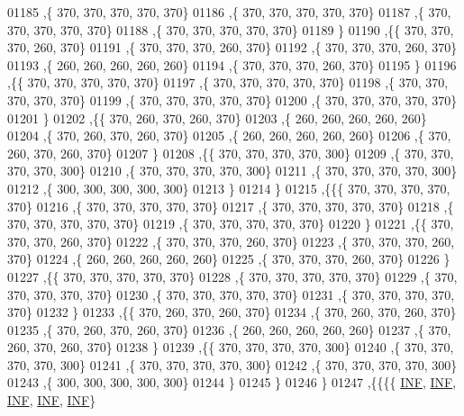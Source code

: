 \begin{DoxyCode}
01185    ,\{   370,   370,   370,   370,   370\}
01186    ,\{   370,   370,   370,   370,   370\}
01187    ,\{   370,   370,   370,   370,   370\}
01188    ,\{   370,   370,   370,   370,   370\}
01189    \}
01190   ,\{\{   370,   370,   370,   260,   370\}
01191    ,\{   370,   370,   370,   260,   370\}
01192    ,\{   370,   370,   370,   260,   370\}
01193    ,\{   260,   260,   260,   260,   260\}
01194    ,\{   370,   370,   370,   260,   370\}
01195    \}
01196   ,\{\{   370,   370,   370,   370,   370\}
01197    ,\{   370,   370,   370,   370,   370\}
01198    ,\{   370,   370,   370,   370,   370\}
01199    ,\{   370,   370,   370,   370,   370\}
01200    ,\{   370,   370,   370,   370,   370\}
01201    \}
01202   ,\{\{   370,   260,   370,   260,   370\}
01203    ,\{   260,   260,   260,   260,   260\}
01204    ,\{   370,   260,   370,   260,   370\}
01205    ,\{   260,   260,   260,   260,   260\}
01206    ,\{   370,   260,   370,   260,   370\}
01207    \}
01208   ,\{\{   370,   370,   370,   370,   300\}
01209    ,\{   370,   370,   370,   370,   300\}
01210    ,\{   370,   370,   370,   370,   300\}
01211    ,\{   370,   370,   370,   370,   300\}
01212    ,\{   300,   300,   300,   300,   300\}
01213    \}
01214   \}
01215  ,\{\{\{   370,   370,   370,   370,   370\}
01216    ,\{   370,   370,   370,   370,   370\}
01217    ,\{   370,   370,   370,   370,   370\}
01218    ,\{   370,   370,   370,   370,   370\}
01219    ,\{   370,   370,   370,   370,   370\}
01220    \}
01221   ,\{\{   370,   370,   370,   260,   370\}
01222    ,\{   370,   370,   370,   260,   370\}
01223    ,\{   370,   370,   370,   260,   370\}
01224    ,\{   260,   260,   260,   260,   260\}
01225    ,\{   370,   370,   370,   260,   370\}
01226    \}
01227   ,\{\{   370,   370,   370,   370,   370\}
01228    ,\{   370,   370,   370,   370,   370\}
01229    ,\{   370,   370,   370,   370,   370\}
01230    ,\{   370,   370,   370,   370,   370\}
01231    ,\{   370,   370,   370,   370,   370\}
01232    \}
01233   ,\{\{   370,   260,   370,   260,   370\}
01234    ,\{   370,   260,   370,   260,   370\}
01235    ,\{   370,   260,   370,   260,   370\}
01236    ,\{   260,   260,   260,   260,   260\}
01237    ,\{   370,   260,   370,   260,   370\}
01238    \}
01239   ,\{\{   370,   370,   370,   370,   300\}
01240    ,\{   370,   370,   370,   370,   300\}
01241    ,\{   370,   370,   370,   370,   300\}
01242    ,\{   370,   370,   370,   370,   300\}
01243    ,\{   300,   300,   300,   300,   300\}
01244    \}
01245   \}
01246  \}
01247 ,\{\{\{\{   \mbox{\hyperlink{1_88_84__epars_8h_a12c2040f25d8e3a7b9e1c2024c618cb6}{INF}},   \mbox{\hyperlink{1_88_84__epars_8h_a12c2040f25d8e3a7b9e1c2024c618cb6}{INF}},   \mbox{\hyperlink{1_88_84__epars_8h_a12c2040f25d8e3a7b9e1c2024c618cb6}{INF}},   \mbox{\hyperlink{1_88_84__epars_8h_a12c2040f25d8e3a7b9e1c2024c618cb6}{INF}},   \mbox{\hyperlink{1_88_84__epars_8h_a12c2040f25d8e3a7b9e1c2024c618cb6}{INF}}\}

\end{DoxyCode}
